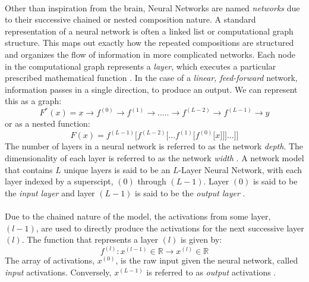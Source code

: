 \documentclass[12pt,letterpaper]{article}
\begin{document}
\paragraph*{}Other than inspiration from the brain, Neural Networks are named \textit{networks} due to their successive chained or nested composition nature. A standard representation of a neural network is often a linked list or computational graph structure. This maps out exactly how the repeated compositions are structured and organizes the flow of information in more complicated networks. Each node in the computational graph represents a \textit{layer}, which executes a particular prescribed mathematical function \cite{Goodfellow}. In the case of a \textit{linear, feed-forward} network, information passes in a single direction, to produce an output. We can represent this as a graph:
\begin{equation}
\label{eqn-FunctionGraph}
F^*(x) = x \rightarrow f^{(0)} \rightarrow f^{(1)} \rightarrow ..... \rightarrow
f^{(L-2)} \rightarrow f^{(L-1)} \rightarrow y
\end{equation}
or as a nested function:
\begin{equation}
\label{eqn-FunctionChain}
F(x) = f^{(L-1)}\big[f^{(L-2)}\big[...f^{(1)}\big[f^{(0)}\big[x]\big]\big]...\big]\big]
\end{equation}
The number of layers in a neural network is referred to as the network \textit{depth}. The dimensionality of each layer is referred to as the network \textit{width} \cite{Geron,Loy}.
A network model that contains $L$ unique layers is said to be an $L$-Layer Neural Network, with each layer indexed by a superscipt, $(0)$ through $(L-1)$. Layer $(0)$ is said to be the \textit{input layer} and layer $(L-1)$ is said to be the \textit{output layer} \cite{Geron,Loy}. 

\paragraph*{}Due to the chained nature of the model, the activations from some layer, $(l-1)$, are used to directly produce the activations for the next successive layer $(l)$. The function that represents a layer $(l)$ is given by:
\begin{equation}
\label{eqn-altLayerFunction}
f^{(l)} : x^{(l-1)} \in \mathbb{R} \rightarrow x^{(l)} \in \mathbb{R}
\end{equation}
The array of activations, $x^{(0)}$, is the raw input given the neural network, called \textit{input} activations. Conversely, $x^{(L-1)}$ is referred to as \textit{output} activations \cite{Geron,James,Loy}.
\end{document}
